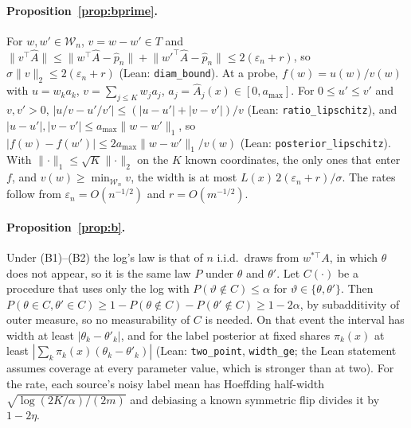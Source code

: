 \paragraph{Proposition~\ref{prop:bprime}.} For $w,w'\in\mathcal W_n$, $v=w-w'\in T$ and
$\lVert v^{\top}\hat A\rVert\le\lVert w^{\top}\hat A-\hat p_n\rVert+\lVert w'^{\top}\hat A-\hat p_n\rVert
\le2(\varepsilon_n+r)$, so $\sigma\lVert v\rVert_2\le2(\varepsilon_n+r)$ (Lean: \texttt{diam\_bound}).
At a probe, $f(w)=u(w)/v(w)$ with $u=w_ka_k$, $v=\sum_{j\le K}w_ja_j$, $a_j=\hat A_j(x)\in[0,a_{\max}]$.
For $0\le u'\le v'$ and $v,v'>0$, $|u/v-u'/v'|\le(|u-u'|+|v-v'|)/v$ (Lean: \texttt{ratio\_lipschitz}),
and $|u-u'|,|v-v'|\le a_{\max}\lVert w-w'\rVert_1$, so
$|f(w)-f(w')|\le2a_{\max}\lVert w-w'\rVert_1/v(w)$ (Lean: \texttt{posterior\_lipschitz}). With
$\lVert\cdot\rVert_1\le\sqrt{K}\lVert\cdot\rVert_2$ on the $K$ known coordinates, the only ones that
enter $f$, and $v(w)\ge\min_{\mathcal W_n}v$, the width is at most
$L(x)\,2(\varepsilon_n+r)/\sigma$. The rates follow from $\varepsilon_n=O(n^{-1/2})$ and
$r=O(m^{-1/2})$.

\paragraph{Proposition~\ref{prop:b}.} Under (B1)--(B2) the log's law is that of $n$ i.i.d.\ draws from
$w^{*\top}A$, in which $\theta$ does not appear, so it is the same law $P$ under $\theta$ and $\theta'$.
Let $C(\cdot)$ be a procedure that uses only the log with $P(\vartheta\notin C)\le\alpha$ for
$\vartheta\in\{\theta,\theta'\}$. Then $P(\theta\in C,\theta'\in C)\ge1-P(\theta\notin C)-P(\theta'\notin C)
\ge1-2\alpha$, by subadditivity of outer measure, so no measurability of $C$ is needed. On that event
the interval has width at least $|\theta_k-\theta'_k|$, and for the label posterior at fixed shares
$\pi_k(x)$ at least $|\sum_k\pi_k(x)(\theta_k-\theta'_k)|$ (Lean: \texttt{two\_point}, \texttt{width\_ge};
the Lean statement assumes coverage at every parameter value, which is stronger than at two). For the rate, each source's
noisy label mean has Hoeffding half-width $\sqrt{\log(2K/\alpha)/(2m)}$ and debiasing a known
symmetric flip divides it by $1-2\eta$.

